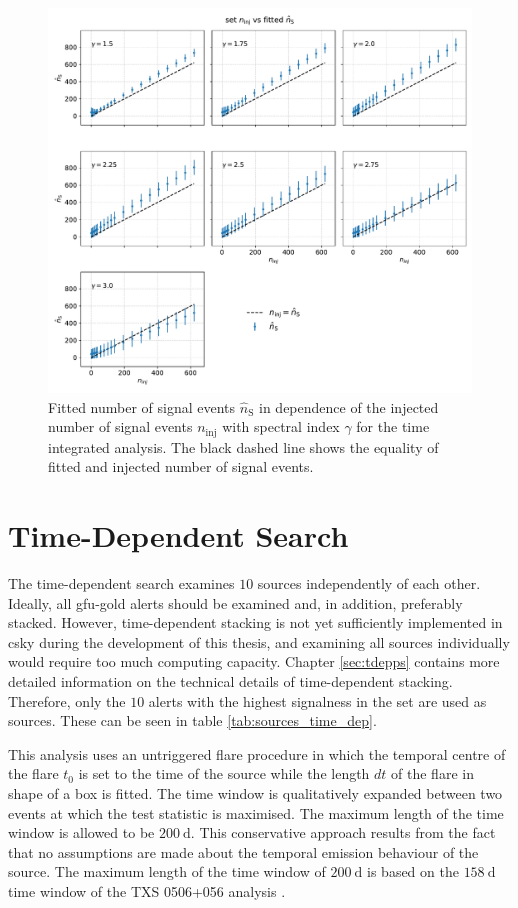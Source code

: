 \begin{figure}
    \centering
    \includegraphics[width=\linewidth]{Plots/05_csky/ns_fit_auto_4.pdf}
    \caption{Fitted number of signal events $\hat{n}_{\text{S}}$ in dependence of the injected number of signal events $n_\text{inj}$ with spectral index $\gamma$ for the time integrated analysis. The black dashed line shows the equality of fitted and injected number of signal events.}
    \label{fig:fit_bias_ns}
\end{figure}

\chapter{Time-Dependent Search} \label{sec:csky_time_dep}

The time-dependent search examines $\num{10}$ sources independently of each other.
Ideally, all gfu-gold alerts should be examined and, in addition, preferably stacked.
However, time-dependent stacking is not yet sufficiently implemented in csky during the development of this thesis, and examining all sources individually would require too much computing capacity.
Chapter \ref{sec:tdepps} contains more detailed information on the technical details of time-dependent stacking.
Therefore, only the $\num{10}$ alerts with the highest signalness in the set are used as sources.
These can be seen in table \ref{tab:sources_time_dep}.

This analysis uses an untriggered flare procedure in which the temporal centre of the flare $t_0$ is set to the time of the source while the length $dt$ of the flare in shape of a box is fitted.
The time window is qualitatively expanded between two events at which the test statistic is maximised.
The maximum length of the time window is allowed to be $\SI{200}{\day}$.
This conservative approach results from the fact that no assumptions are made about the temporal emission behaviour of the source.
The maximum length of the time window of $\SI{200}{\day}$ is based on the $\SI{158}{\day}$ time window of the TXS 0506+056 analysis \cite{txs}.

